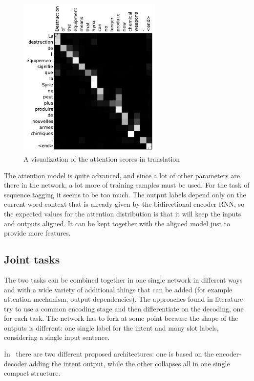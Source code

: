 \begin{figure}[!htb]
    \centering
    \includegraphics[max width=0.9\linewidth,max height=8cm,keepaspectratio]{figures/attentionVisualization}
    \caption{A visualization of the attention scores in translation~\cite{bahdanau2014neural}}\label{fig:attentionVisualization}
\end{figure}

The attention model is quite advanced, and since a lot of other parameters are there in the network, a lot more of training samples must be used.
For the task of sequence tagging it seems to be too much. The output labels depend only on the current word context that is already given by the bidirectional encoder RNN, so the expected values for the attention distribution is that it will keep the inputs and outputs aligned. It can be kept together with the aligned model just to provide more features.

\subsection{Joint tasks}
The two tasks can be combined together in one single network in different ways and with a wide variety of additional things that can be added (for example attention mechanism, output dependencies). The approaches found in literature try to use a common encoding stage and then differentiate on the decoding, one for each task. The network has to fork at some point because the shape of the outputs is different: one single label for the intent and many slot labels, considering a single input sentence.

In~\cite{liu2016attention} there are two different proposed architectures: one is based on the encoder-decoder adding the intent output, while the other collapses all in one single compact structure.

